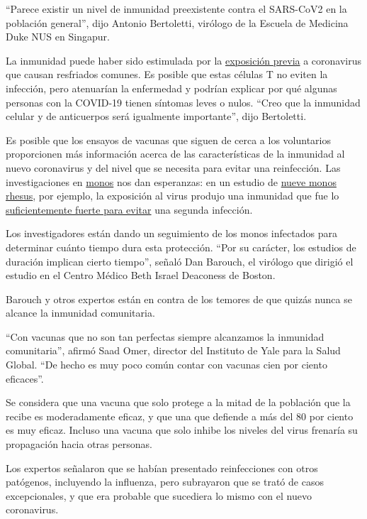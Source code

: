 ``Parece existir un nivel de inmunidad preexistente contra el SARS-CoV2
en la población general'', dijo Antonio Bertoletti, virólogo de la
Escuela de Medicina Duke NUS en Singapur.

La inmunidad puede haber sido estimulada por la
\href{https://immunology.sciencemag.org/content/5/48/eabd2071}{exposición
previa} a coronavirus que causan resfriados comunes. Es posible que
estas células T no eviten la infección, pero atenuarían la enfermedad y
podrían explicar por qué algunas personas con la COVID-19 tienen
síntomas leves o nulos. ``Creo que la inmunidad celular y de anticuerpos
será igualmente importante'', dijo Bertoletti.

Es posible que los ensayos de vacunas que siguen de cerca a los
voluntarios proporcionen más información acerca de las características
de la inmunidad al nuevo coronavirus y del nivel que se necesita para
evitar una reinfección. Las investigaciones en
\href{https://science.sciencemag.org/content/early/2020/07/01/science.abc5343}{monos}
nos dan esperanzas: en un estudio de
\href{https://science.sciencemag.org/content/early/2020/05/19/science.abc4776}{nueve
monos rhesus}, por ejemplo, la exposición al virus produjo una inmunidad
que fue lo
\href{https://www.nytimes.com/2020/05/20/health/coronavirus-vaccine-harvard.html}{suficientemente
fuerte para evitar} una segunda infección.

Los investigadores están dando un seguimiento de los monos infectados
para determinar cuánto tiempo dura esta protección. ``Por su carácter,
los estudios de duración implican cierto tiempo'', señaló Dan Barouch,
el virólogo que dirigió el estudio en el Centro Médico Beth Israel
Deaconess de Boston.

Barouch y otros expertos están en contra de los temores de que quizás
nunca se alcance la inmunidad comunitaria.

``Con vacunas que no son tan perfectas siempre alcanzamos la inmunidad
comunitaria'', afirmó Saad Omer, director del Instituto de Yale para la
Salud Global. ``De hecho es muy poco común contar con vacunas cien por
ciento eficaces''.

Se considera que una vacuna que solo protege a la mitad de la población
que la recibe es moderadamente eficaz, y que una que defiende a más del
80 por ciento es muy eficaz. Incluso una vacuna que solo inhibe los
niveles del virus frenaría su propagación hacia otras personas.

Los expertos señalaron que se habían presentado reinfecciones con otros
patógenos, incluyendo la influenza, pero subrayaron que se trató de
casos excepcionales, y que era probable que sucediera lo mismo con el
nuevo coronavirus.


